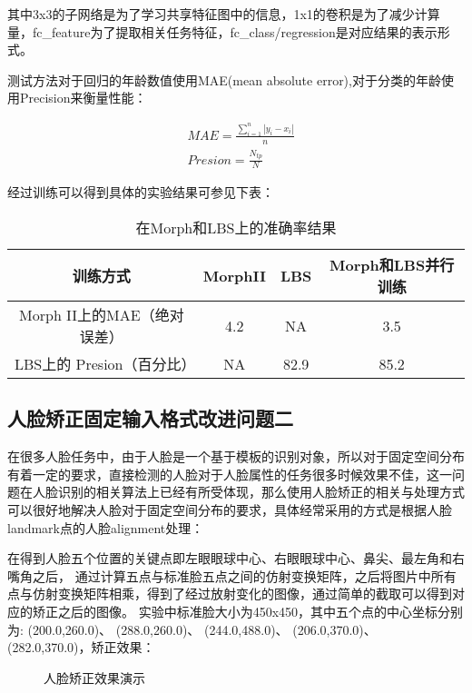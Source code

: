 其中3x3的子网络是为了学习共享特征图中的信息，1x1的卷积是为了减少计算量，fc\_feature为了提取相关任务特征，fc\_class/regression是对应结果的表示形式。

测试方法对于回归的年龄数值使用MAE(mean absolute error),对于分类的年龄使用Precision来衡量性能：

\begin{equation}{
\begin{split}
& MAE=\frac{\sum_{i=1}^{n} \left | y_i-x_i \right |}{n}  \\
& Presion=\frac{N_{tp}}{N}
\end{split}
}\end{equation}

经过训练可以得到具体的实验结果可参见下表：
 \begin{table}[!h]
  \centering
   \caption{在Morph和LBS上的准确率结果}
   \label{tab:req-pkg}
   \begin{tabular}{c|c|c|c}
     \toprule
     训练方式&MorphII& LBS& Morph和LBS并行训练\\
     \midrule
     Morph II上的MAE（绝对误差）&4.2  &NA & 3.5 \\
     LBS上的 Presion（百分比）&NA  &82.9& 85.2\\
     \bottomrule
   \end{tabular}
 \end{table}

\subsection{人脸矫正固定输入格式改进问题二}
在很多人脸任务中，由于人脸是一个基于模板的识别对象，所以对于固定空间分布有着一定的要求，直接检测的人脸对于人脸属性的任务很多时候效果不佳，这一问题在人脸识别的相关算法上已经有所受体现，那么使用人脸矫正的相关与处理方式可以很好地解决人脸对于固定空间分布的要求，具体经常采用的方式是根据人脸landmark点的人脸alignment处理：

在得到人脸五个位置的关键点即左眼眼球中心、右眼眼球中心、鼻尖、最左角和右嘴角之后，
通过计算五点与标准脸五点之间的仿射变换矩阵，之后将图片中所有点与仿射变换矩阵相乘，得到了经过放射变化的图像，通过简单的截取可以得到对应的矫正之后的图像。
实验中标准脸大小为450x450，其中五个点的中心坐标分别为:
(200.0,260.0)、 (288.0,260.0)、 (244.0,488.0)、 (206.0,370.0)、 (282.0,370.0)，矫正效果：
\begin{figure}[!h]
 \centering
	\caption{人脸矫正效果演示}
\end{figure}

